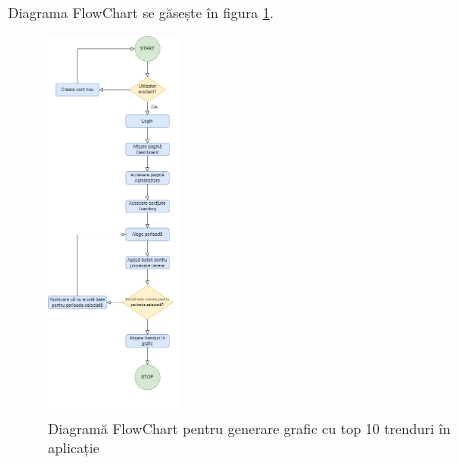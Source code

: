 \begin{enumerate}
    \ \\
    Diagrama FlowChart se găsește în figura \ref{fig:trends}.
    \begin{figure}[H]
        \centering
        \includegraphics[height=100mm]{figs/trends.png}
        \caption{Diagramă FlowChart pentru generare grafic cu top 10 trenduri în aplicație}
        \label{fig:trends}
    \end{figure}


\end{enumerate}
